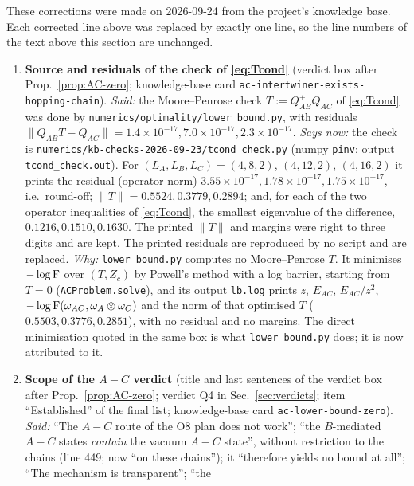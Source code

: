 \documentclass[11pt]{article}
\begin{document}
These corrections were made on 2026-09-24 from the project's knowledge base.
Each corrected line above was replaced by exactly one line, so the line numbers
of the text above this section are unchanged.

\begin{enumerate}[leftmargin=2.4em,itemsep=4pt]
\item[\textbf{C1.}] \textbf{Source and residuals of the check of \eqref{eq:Tcond}}
 (verdict box after Prop.~\ref{prop:AC-zero}; knowledge-base card
 \texttt{ac-intertwiner-exists-hopping-chain}).
 \emph{Said:} the Moore--Penrose check \(T:=Q_{AB}^{+}Q_{AC}\) of \eqref{eq:Tcond}
 was done by \texttt{numerics/optimality/lower\_bound.py}, with residuals
 \(\|Q_{AB}T-Q_{AC}\|=1.4\times10^{-17},7.0\times10^{-17},2.3\times10^{-17}\).
 \emph{Says now:} the check is
 \texttt{numerics/kb-checks-2026-09-23/\allowbreak tcond\_check.py} (numpy
 \texttt{pinv}; output \texttt{tcond\_check.out}). For
 \((L_A,L_B,L_C)=(4,8,2)\), \((4,12,2)\), \((4,16,2)\) it prints the residual (operator
 norm) \(3.55\times10^{-17},1.78\times10^{-17},1.75\times10^{-17}\), i.e.\
 round-off; \(\|T\|=0.5524,0.3779,0.2894\); and, for each of the two operator
 inequalities of \eqref{eq:Tcond}, the smallest eigenvalue of the difference,
 \(0.1216,0.1510,0.1630\). The printed \(\|T\|\) and margins were right to three
 digits and are kept. The printed residuals are reproduced by no script and are
 replaced.
 \emph{Why:} \texttt{lower\_bound.py} computes no Moore--Penrose \(T\). It
 minimises \(-\log\operatorname{F}\) over \((T,Z_c)\) by Powell's method with a log barrier,
 starting from \(T=0\) (\texttt{ACProblem.solve}), and its output \texttt{lb.log}
 prints \(z\), \(E_{AC}\), \(E_{AC}/z^2\), \(-\log\operatorname{F}(\omega_{AC},\omega_A\otimes\omega_C)\) and the norm of that optimised \(T\)
 (\(0.5503,0.3776,0.2851\)), with no residual and no margins. The direct
 minimisation quoted in the same box is what \texttt{lower\_bound.py} does; it is
 now attributed to it.
\item[\textbf{C2.}] \textbf{Scope of the \(A\!-\!C\) verdict} (title and last
 sentences of the verdict box after Prop.~\ref{prop:AC-zero}; verdict Q4 in
 Sec.~\ref{sec:verdicts}; item ``Established'' of the final list;
 knowledge-base card \texttt{ac-lower-bound-zero}).
 \emph{Said:} ``The \(A\!-\!C\) route of the O8 plan does not work''; ``the
 \(B\)-mediated \(A\!-\!C\) states \emph{contain} the vacuum \(A\!-\!C\) state'', without
 restriction to the chains (line 449; now ``on these chains''); it
 ``therefore yields no bound at all''; ``The mechanism is transparent''; ``the

\end{enumerate}
\end{document}

